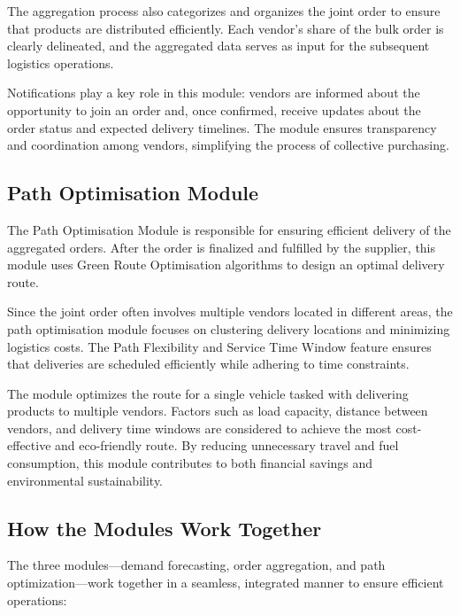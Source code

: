 The aggregation process also categorizes and organizes the joint order to ensure that products are distributed efficiently. Each vendor's share of the bulk order is clearly delineated, and the aggregated data serves as input for the subsequent logistics operations.

Notifications play a key role in this module: vendors are informed about the opportunity to join an order and, once confirmed, receive updates about the order status and expected delivery timelines. The module ensures transparency and coordination among vendors, simplifying the process of collective purchasing.

\subsection{Path Optimisation Module}

The Path Optimisation Module is responsible for ensuring efficient delivery of the aggregated orders. After the order is finalized and fulfilled by the supplier, this module uses Green Route Optimisation algorithms to design an optimal delivery route.

Since the joint order often involves multiple vendors located in different areas, the path optimisation module focuses on clustering delivery locations and minimizing logistics costs. The Path Flexibility and Service Time Window feature ensures that deliveries are scheduled efficiently while adhering to time constraints.

The module optimizes the route for a single vehicle tasked with delivering products to multiple vendors. Factors such as load capacity, distance between vendors, and delivery time windows are considered to achieve the most cost-effective and eco-friendly route. By reducing unnecessary travel and fuel consumption, this module contributes to both financial savings and environmental sustainability.

\subsection{How the Modules Work Together}

The three modules—demand forecasting, order aggregation, and path optimization—work together in a seamless, integrated manner to ensure efficient operations:


